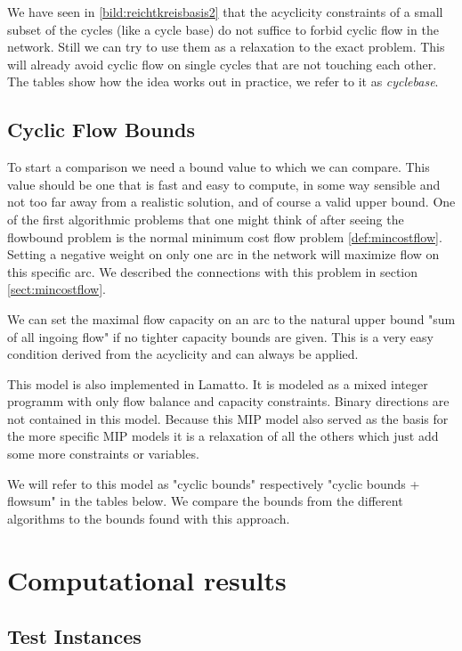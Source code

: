 We have seen in \ref{bild:reichtkreisbasis2} that the acyclicity constraints of a small subset of the cycles (like a 
cycle base) do not suffice to forbid cyclic flow  in the network. Still we can try to use them as a relaxation to the 
exact problem. This will already avoid cyclic flow on single cycles that are not touching each other. The tables show 
how the idea works out in practice, we refer to it as \textit{cyclebase}.

\subsection{Cyclic Flow Bounds}%
\label{model:cyclicFlow}
To start a comparison we need a bound value to which we can compare. This value should be one that is fast and 
easy to compute, in some way sensible and not too far away from a realistic solution, and of course a valid upper 
bound. 
One of the first algorithmic problems that one might think of after seeing the flowbound problem is the normal minimum 
cost flow problem \ref{def:mincostflow}. Setting a negative weight on only one arc in the network will 
maximize flow on this specific arc. We described the connections with this problem in section \ref{sect:mincostflow}. 

We can set the maximal flow capacity on an arc to the natural upper bound "sum of all ingoing flow" if no tighter 
capacity bounds are given. This is a very easy condition derived from the acyclicity and can always be applied.

This model is also implemented in Lamatto. It is modeled as a mixed integer programm with only flow balance and 
capacity constraints. Binary directions are not contained in this model. Because this MIP model also served as the 
basis for the more specific MIP models it is a relaxation of all the others which just add some more constraints or 
variables.

We will refer to this model as "cyclic bounds" respectively "cyclic bounds + flowsum" in the tables below. We compare 
the bounds from the different algorithms to the bounds found with this approach. 


\section{Computational results}
\subsection{Test Instances}

